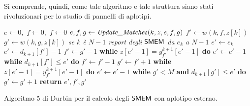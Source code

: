 Si comprende, quindi, come tale algoritmo e tale struttura siano stati
rivoluzionari per lo studio di pannelli di aplotipi.
\begin{algorithm}
  \begin{algorithmic}[1]   
    \State $e\gets 0,\,\,f\gets 0,\,\,f\gets 0$
    \State $e,f,g\gets \mbox{\textit{Update\_Matches}}(k, z, e, f, g)$
    \EndFor
    \EndFunction
    \State
    \State $f'\gets w(k, f, z[k])$
    \State $g'\gets w(k, g, z[k])$
    \Comment\textit{{se $k$ è $N-1$ report degli $\mbox{\rm {\sf SMEM}}$ da $e_k$ a $N-1$}}
    \State $e'\gets e_k$
    \Else
    \State $e'\gets d_{k+1}[f']-1$
    \State $f'\gets g'-1$
    \State \textbf{while} $z[e'-1]=y_{f'}^{k+1}[e'-1]$ \textbf{do} $e'\gets
    e'-1$
    \State \textbf{while} $d_{k+1}[f']\leq e'$ \textbf{do} $f'\gets f'-1$
    \Else
    \State $g'\gets f'+1$
    \State \textbf{while} $z[e'-1]=y_{f'}^{k+1}[e'-1]$ \textbf{do}  $e'\gets
    e'-1$ 
    \State \textbf{while} $g'<M$ \textbf{and} $d_{k+1}[g']\leq e'$ \textbf{do}
    $g'\gets g'+1$ 
    \EndIf
    \EndIf
    \State \textbf{return} $e',f',g'$
    \EndFunction
  \end{algorithmic}
  \caption{\footnotesize{Algoritmo 5 di Durbin per il calcolo degli $\mbox{\rm {\sf SMEM}}$ con
  aplotipo esterno.}}
  \label{algo:dur5}
\end{algorithm}
